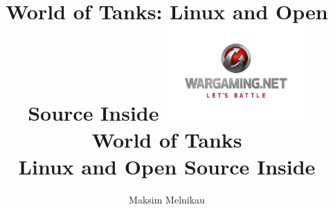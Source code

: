 \documentclass[aspectratio=169]{beamer}
\begin{document}
\title{World of Tanks: Linux and Open Source Inside}
\author{Maksim Melnikau}
\date{}

{
\title{
    \includegraphics[width=0.4\textwidth]{wg-logo.png}
    \\
    {\huge World of Tanks\\Linux and Open Source Inside}
}
\begin{frame}[plain]{}
    \titlepage
\end{frame}
}

\end{document}
